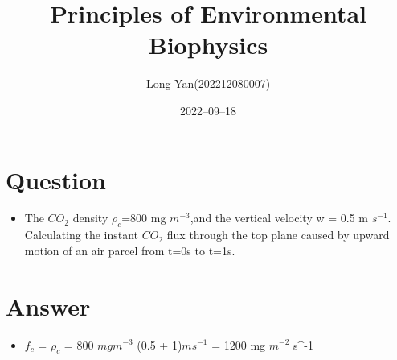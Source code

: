 \documentclass[12pt]{article}
\title{Principles of Environmental Biophysics}
\author{Long Yan(202212080007)}
\date{2022–09–18}
\begin{document}
\maketitle

\section{Question}
\begin{itemize}
\item The $CO_2$ density $\rho_c$=800 mg $m^{-3}$,and the vertical velocity w = 0.5 m $s^{-1}$.
Calculating the instant $CO_2$ flux through the top plane caused by upward motion of an air parcel
from t=0s to t=1s.
\end{itemize}
\section{Answer}
\begin{itemize}
\item $f_c$ = $\rho_c$ \cdot {} =  800 $mg m^{-3}$  \cdot (0.5 + 1)$m s^{-1}$ = 1200 mg $m^{-2}$ s^{-1}
\end{itemize}
\end{document}
